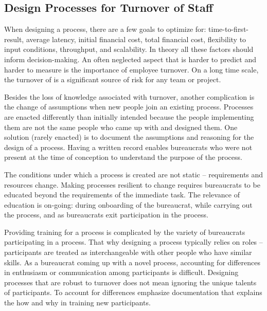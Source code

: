 \subsection*{Design Processes for Turnover of Staff\label{sec:turnover}}


When designing a \gls{process}, there are a few goals to optimize for: time-to-first-result, average latency, initial financial cost, total financial cost, flexibility to input conditions, throughput, and scalability. In theory all these factors should inform decision-making. An often neglected aspect that is harder to predict and harder to measure is the importance of employee turnover. 
On a long time scale, the turnover of \iftoggle{glossarysubstitutionworks}{\glspl{bureaucrat}}{bureaucrats} is 
a significant source of risk for any team or project. 

Besides the loss of knowledge associated with turnover, another complication is the change of assumptions when new people join an existing process. 
Processes are enacted differently than initially intended because the people implementing them are not the same people who came up with and designed them. One solution (rarely enacted) is to document the assumptions and reasoning for the design of a process. Having a written record enables bureaucrats who were not present at the time of conception to understand the purpose of the process. 

The conditions under which a process is created are not static -- requirements and resources change. 
Making processes resilient to change requires  bureaucrats to be educated beyond the requirements of the immediate task. The relevance of education is on-going: during onboarding of the bureaucrat, while carrying out the process, and as bureaucrats exit participation in the process. 

Providing training for a process is complicated by the variety of bureaucrats participating in a process.
That why designing a process typically relies on roles -- participants are treated as interchangeable with other people who have similar skills. As a bureaucrat coming up with a novel process, accounting for differences in enthusiasm or communication among participants is difficult. 
Designing processes that are robust to turnover does not mean ignoring the unique talents of participants. 
To account for differences emphasize documentation that explains the how and why in training new participants. 


